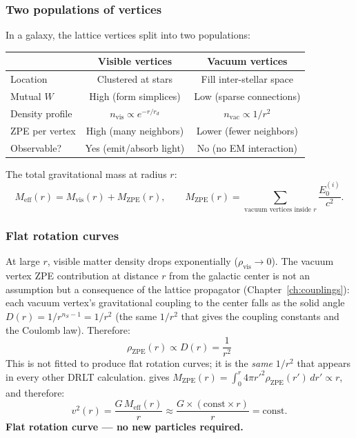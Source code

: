 \documentclass[12pt]{article}
\theoremstyle{remark}
\theoremstyle{definition}
\begin{document}
\subsubsection{Two populations of vertices}

In a galaxy, the lattice vertices split into two populations:

\begin{center}
\begin{tabular}{lcc}
\hline
& Visible vertices & Vacuum vertices \\
\hline
Location & Clustered at stars & Fill inter-stellar space \\
Mutual $W$ & High (form simplices) & Low (sparse connections) \\
Density profile & $n_\text{vis} \propto e^{-r/r_d}$ & $n_\text{vac} \propto 1/r^2$ \\
ZPE per vertex & High (many neighbors) & Lower (fewer neighbors) \\
Observable? & Yes (emit/absorb light) & No (no EM interaction) \\
\hline
\end{tabular}
\end{center}

The total gravitational mass at radius $r$:
\begin{equation}
M_\text{eff}(r) = M_\text{vis}(r) + M_\text{ZPE}(r), \qquad M_\text{ZPE}(r) = \sum_{\text{vacuum vertices inside } r} \frac{E_0^{(i)}}{c^2}.
\end{equation}

\subsubsection{Flat rotation curves}

At large $r$, visible matter density drops exponentially ($\rho_\text{vis} \to 0$). The vacuum vertex ZPE contribution at distance $r$ from the galactic center is not an assumption but a consequence of the lattice propagator (Chapter~\ref{ch:couplings}): each vacuum vertex's gravitational coupling to the center falls as the solid angle $D(r) = 1/r^{n_S - 1} = 1/r^2$ (the same $1/r^2$ that gives the coupling constants and the Coulomb law). Therefore:
\begin{equation}
\rho_\text{ZPE}(r) \propto D(r) = \frac{1}{r^2}
\end{equation}
This is not fitted to produce flat rotation curves; it is the \emph{same} $1/r^2$ that appears in every other DRLT calculation.
gives $M_\text{ZPE}(r) = \int_0^r 4\pi r'^2 \rho_\text{ZPE}(r')\,dr' \propto r$, and therefore:
\begin{equation}
v^2(r) = \frac{G\,M_\text{eff}(r)}{r} \approx \frac{G \times (\text{const}\times r)}{r} = \text{const}.
\end{equation}
\textbf{Flat rotation curve --- no new particles required.}
\end{document}
